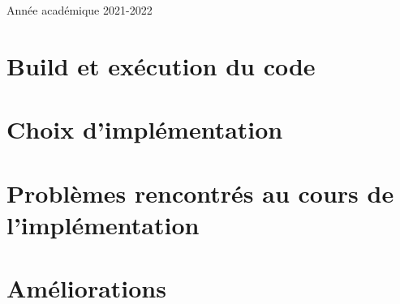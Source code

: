 \documentclass{article}
\begin{document}
\begin{titlepage}
\begin{center}
        {\large Année académique 2021-2022}
        
    \end{center}
\end{titlepage}

\tableofcontents

\newpage

\section{Build et exécution du code}


\section{Choix d'implémentation}


\newpage
\section{Problèmes rencontrés au cours de l'implémentation}


\section{Améliorations}

\end{document}
